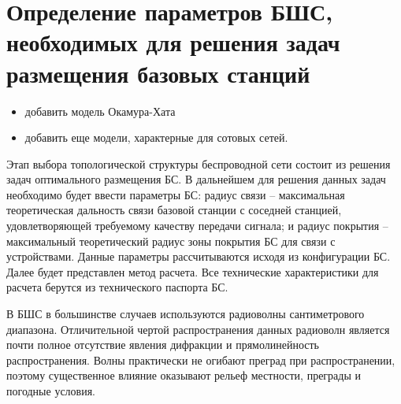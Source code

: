 \section{Определение параметров БШС, необходимых для решения задач размещения базовых станций} \label{section:part_1_link_distance}

\begin{itemize}
  \item добавить модель Окамура-Хата
  \item добавить еще модели, характерные для сотовых сетей.
\end{itemize}

Этап выбора топологической структуры беспроводной сети состоит из решения задач оптимального размещения БС. В дальнейшем для решения данных задач необходимо будет ввести параметры БС: радиус связи -- максимальная теоретическая дальность связи базовой станции с соседней станцией, удовлетворяющей требуемому качеству передачи сигнала; и радиус покрытия -- максимальный теоретический радиус зоны покрытия БС для связи с устройствами. Данные параметры рассчитываются исходя из конфигурации БС. Далее будет представлен метод расчета. Все технические характеристики для расчета берутся из технического паспорта БС.




В БШС в большинстве случаев используются радиоволны сантиметрового диапазона. Отличительной чертой распространения данных радиоволн  является почти полное отсутствие явления дифракции и прямолинейность распространения. Волны практически не огибают преград при распространении, поэтому существенное влияние оказывают рельеф местности, преграды и погодные условия. 

